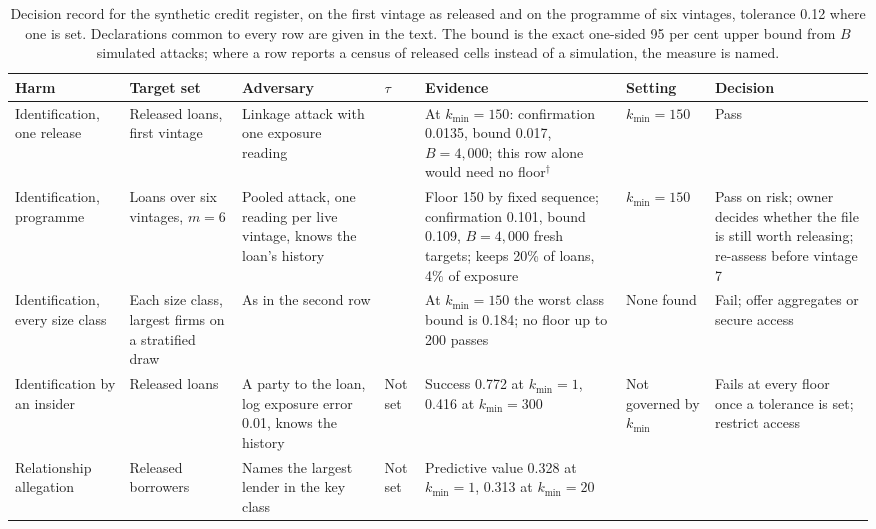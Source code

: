 \begin{table}[p]
\centering
\caption{Decision record for the synthetic credit register, on the first vintage as
released and on the programme of six vintages, tolerance 0.12 where one is set.
Declarations common to every row are given in the text. The bound is the exact
one-sided 95 per cent upper bound from $B$ simulated attacks; where a row reports a
census of released cells instead of a simulation, the measure is named.}
\label{c16:tab-record}
\footnotesize
\setlength{\tabcolsep}{3pt}
\begin{tabular}{@{}>{\raggedright\arraybackslash}p{1.9cm}>{\raggedright\arraybackslash}p{2.0cm}>{\raggedright\arraybackslash}p{2.4cm}>{\raggedright\arraybackslash}p{0.7cm}>{\raggedright\arraybackslash}p{2.6cm}>{\raggedright\arraybackslash}p{1.8cm}>{\raggedright\arraybackslash}p{2.2cm}@{}}
\toprule
Harm & Target set & Adversary & $\tau$ & Evidence & Setting & Decision \\
\midrule
Identification, one release & Released loans, first vintage & Linkage attack with
one exposure reading & 0.12 & At $k_{\min} = 150$: confirmation 0.0135, bound
0.017, $B = 4{,}000$; this row alone would need no floor$^{\dagger}$ & $k_{\min} = 150$ & Pass \\
\addlinespace
Identification, programme & Loans over six vintages, $m = 6$ & Pooled attack, one
reading per live vintage, knows the loan's history & 0.12 & Floor 150 by fixed
sequence; confirmation 0.101, bound 0.109, $B = 4{,}000$ fresh targets; keeps 20\%
of loans, 4\% of exposure & $k_{\min} = 150$ & Pass on risk; owner decides whether
the file is still worth releasing; re-assess before vintage 7 \\
\addlinespace
Identification, every size class & Each size class, largest firms on a stratified
draw & As in the second row & 0.12 & At $k_{\min} = 150$ the worst class bound is
0.184; no floor up to 200 passes & None found & Fail; offer aggregates or secure
access \\
\addlinespace
Identification by an insider & Released loans & A party to the loan, log exposure
error 0.01, knows the history & Not set & Success 0.772 at $k_{\min} = 1$, 0.416 at
$k_{\min} = 300$ & Not governed by $k_{\min}$ & Fails at every floor once a tolerance
is set; restrict access \\
\addlinespace
Relationship allegation & Released borrowers & Names the largest lender in the key
class & Not set & Predictive value 0.328 at $k_{\min} = 1$, 0.313 at $k_{\min} = 20$

\end{tabular}
\end{table}

